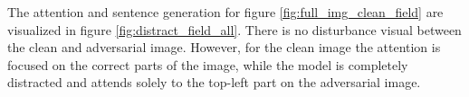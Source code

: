 The attention and sentence generation for figure \ref{fig:full_img_clean_field} are visualized in figure \ref{fig:distract_field_all}. There is no disturbance visual between the clean and adversarial image. However, for the clean image the attention is focused on the correct parts of the image, while the model is completely distracted and attends solely to the top-left part on the adversarial image.

\begin{figure}[ht]
    \centering
    \vspace{\floatsep}
    \vspace{\floatsep}
\end{figure}
